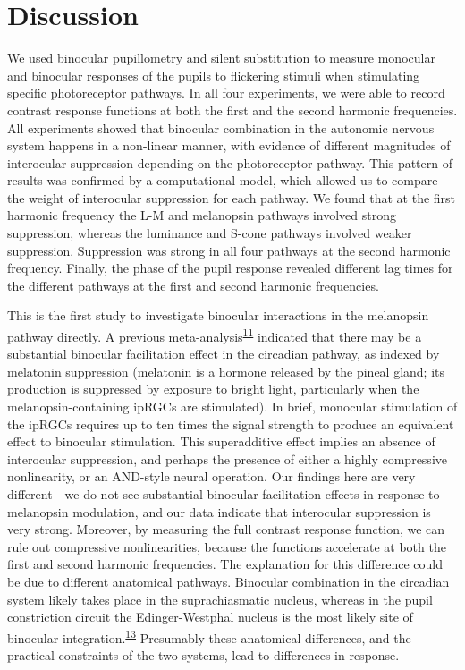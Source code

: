 \documentclass[
]{article}
\begin{document}
\hypertarget{discussion}{%
\section{Discussion}\label{discussion}}

We used binocular pupillometry and silent substitution to measure monocular and binocular responses of the pupils to flickering stimuli when stimulating specific photoreceptor pathways. In all four experiments, we were able to record contrast response functions at both the first and the second harmonic frequencies. All experiments showed that binocular combination in the autonomic nervous system happens in a non-linear manner, with evidence of different magnitudes of interocular suppression depending on the photoreceptor pathway. This pattern of results was confirmed by a computational model, which allowed us to compare the weight of interocular suppression for each pathway. We found that at the first harmonic frequency the L-M and melanopsin pathways involved strong suppression, whereas the luminance and S-cone pathways involved weaker suppression. Suppression was strong in all four pathways at the second harmonic frequency. Finally, the phase of the pupil response revealed different lag times for the different pathways at the first and second harmonic frequencies.

This is the first study to investigate binocular interactions in the melanopsin pathway directly. A previous meta-analysis\textsuperscript{\protect\hyperlink{ref-Spitschan2019}{11}} indicated that there may be a substantial binocular facilitation effect in the circadian pathway, as indexed by melatonin suppression (melatonin is a hormone released by the pineal gland; its production is suppressed by exposure to bright light, particularly when the melanopsin-containing ipRGCs are stimulated). In brief, monocular stimulation of the ipRGCs requires up to ten times the signal strength to produce an equivalent effect to binocular stimulation. This superadditive effect implies an absence of interocular suppression, and perhaps the presence of either a highly compressive nonlinearity, or an AND-style neural operation. Our findings here are very different - we do not see substantial binocular facilitation effects in response to melanopsin modulation, and our data indicate that interocular suppression is very strong. Moreover, by measuring the full contrast response function, we can rule out compressive nonlinearities, because the functions accelerate at both the first and second harmonic frequencies. The explanation for this difference could be due to different anatomical pathways. Binocular combination in the circadian system likely takes place in the suprachiasmatic nucleus, whereas in the pupil constriction circuit the Edinger-Westphal nucleus is the most likely site of binocular integration.\textsuperscript{\protect\hyperlink{ref-Mathot2018}{13}} Presumably these anatomical differences, and the practical constraints of the two systems, lead to differences in response.
\end{document}
